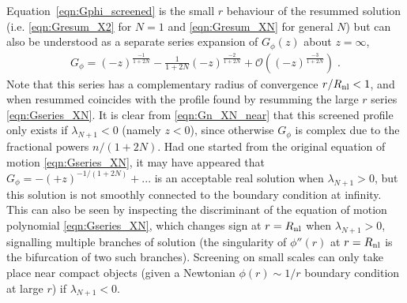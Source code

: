 \documentclass[11pt]{article}
\begin{document}
Equation~\eqref{eqn:Gphi_screened} is the small $r$ behaviour of the resummed solution (i.e. \eqref{eqn:Gresum_X2} for $N=1$ and \eqref{eqn:Gresum_XN} for general $N$) but can also be understood as a separate series expansion of $G_{\phi} (z)$ about $z=\infty$,
\begin{align}
 G_\phi =   \left(   - z  \right)^{\frac{-1}{1+2N}} - \tfrac{1}{1+2N} \left( - z  \right)^{\frac{-2}{1+2N}} +  \mathcal{O} \left( \left(  - z  \right)^{\frac{-3}{1+2N}} \right) \; .
 \label{eqn:Gn_XN_near}
\end{align}
Note that this series has a complementary radius of convergence $r/R_{\rm nl} < 1$, and when resummed coincides with the profile found by resumming the large $r$ series \eqref{eqn:Gseries_XN}.  
It is clear from \eqref{eqn:Gn_XN_near} that this screened profile only exists if $\lambda_{N+1} < 0$ (namely $z<0$), since otherwise $G_\phi$ is complex due to the fractional powers $n/(1+2N)$.
Had one started from the original equation of motion \eqref{eqn:Gseries_XN}, it may have appeared that $G_\phi = - ( + z )^{-1/(1+2N)}+...$ is an acceptable real solution when $\lambda_{N+1} > 0$, but this solution is not smoothly connected to the boundary condition at infinity. 
This can also be seen by inspecting the discriminant of the equation of motion polynomial \eqref{eqn:Gseries_XN}, which changes sign at $r= R_{\rm nl}$ when $\lambda_{N+1}>0$, signalling multiple branches of solution (the singularity of $\phi''(r)$ at $r = R_{\rm nl}$ is the bifurcation of two such branches).  
Screening on small scales can only take place near compact objects (given a Newtonian $\phi(r) \sim 1/r$ boundary condition at large $r$) if $\lambda_{N+1} < 0$. 



\end{document}
